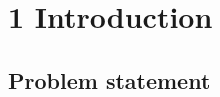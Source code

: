 

\chapter*{1 Introduction}
\label{intro}
\setcounter{chapter}{1}
\setcounter{section}{0}
\section{Problem statement}
\label{ps}

